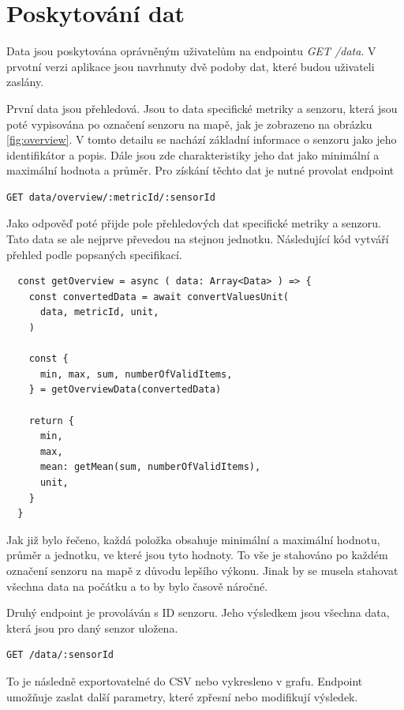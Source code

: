 \documentclass[thesis=M,czech]{FITthesis}[2018/10/20]
\begin{document}
\section{Poskytování dat}
Data jsou poskytována oprávněným uživatelům na endpointu \textit {GET /data}. V prvotní verzi aplikace jsou navrhnuty dvě podoby dat, které budou uživateli zaslány.

První data jsou přehledová. Jsou to data specifické metriky a senzoru, která jsou poté vypisována po označení senzoru na mapě, jak je zobrazeno na obrázku \ref{fig:overview}. V tomto detailu se nachází základní informace o senzoru jako jeho identifikátor a popis. Dále jsou zde charakteristiky jeho dat jako minimální a maximální hodnota a průměr. Pro získání těchto dat je nutné provolat endpoint 
\begin{lstlisting}
GET data/overview/:metricId/:sensorId
\end{lstlisting}
\newpage
Jako odpověď poté přijde pole přehledových dat specifické metriky a senzoru. Tato data se ale nejprve převedou na stejnou jednotku. Následující kód vytváří přehled podle popsaných specifikací.

\begin{lstlisting}
  const getOverview = async ( data: Array<Data> ) => {
    const convertedData = await convertValuesUnit(
      data, metricId, unit,
    ) 
    
    const { 
      min, max, sum, numberOfValidItems,
    } = getOverviewData(convertedData)

    return {
      min,
      max,
      mean: getMean(sum, numberOfValidItems),
      unit,
    }
  }

\end{lstlisting}
Jak již bylo řečeno, každá položka obsahuje minimální a maximální hodnotu, průměr a jednotku, ve které jsou tyto hodnoty. To vše je stahováno po každém označení senzoru na mapě z důvodu lepšího výkonu. Jinak by se musela stahovat všechna data na počátku a to by bylo časově náročné.


Druhý endpoint je provoláván s ID senzoru. Jeho výsledkem jsou všechna data, která jsou pro daný senzor uložena.
\begin{lstlisting}
GET /data/:sensorId
\end{lstlisting}
 To je následně exportovatelné do CSV nebo vykresleno v grafu. Endpoint umožňuje zaslat další parametry, které zpřesní nebo modifikují výsledek.
\end{document}
